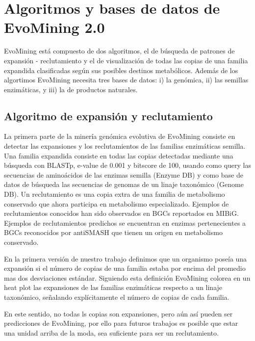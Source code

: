 \documentclass[12pt,twoside]{reedthesis}
\begin{document}
  \section{Algoritmos y bases de datos de EvoMining
  2.0}\label{algoritmos-y-bases-de-datos-de-evomining-2.0}
  
  EvoMining está compuesto de dos algoritmos, el de búsqueda de patrones
  de expansión - reclutamiento y el de visualización de todas las copias
  de una familia expandida clasificadas según sus posibles destinos
  metabólicos. Además de los algortimos EvoMining necesita tres bases de
  datos: i) la genómica, ii) las semillas enzimáticas, y iii) la de
  productos naturales.
  
  \subsection{Algoritmo de expansión y
  reclutamiento}\label{algoritmo-de-expansion-y-reclutamiento}
  
  La primera parte de la minería genómica evolutiva de EvoMining consiste
  en detectar las expansiones y los reclutamientos de las familias
  enzimáticas semilla. Una familia expandida consiste en todas las copias
  detectadas mediante una búsqueda con BLASTp, e-value de 0.001 y bitscore
  de 100, usando como query las secuencias de aminoácidos de las enzimas
  semilla (Enzyme DB) y como base de datos de búsqueda las secuencias de
  genomas de un linaje taxonómico (Genome DB). Un reclutamiento es una
  copia extra de una familia de metabolismo conservado que ahora participa
  en metabolismo especializado. Ejemplos de reclutamientos conocidos han
  sido observados en BGCs reportados en MIBiG. Ejemplos de reclutamientos
  predichos se encuentran en enzimas pertenecientes a BGCs reconocidos por
  antiSMASH que tienen un origen en metabolismo conservado.
  
  En la primera versión de nuestro trabajo definimos que un organismo
  poseía una expansión si el número de copias de una familia estaba por
  encima del promedio mas dos desviaciones estándar. Siguiendo esta
  definición EvoMining colorea en un heat plot las expansiones de las
  familias enzimáticas respecto a un linaje taxonómico, señalando
  explícitamente el número de copias de cada familia.
  
  En este sentido, no todas ls copias son expansiones, pero aún así pueden
  ser predicciones de EvoMining, por ello para futuros trabajos es posible
  que estar una unidad arriba de la moda, sea suficiente para ser un
  reclutamiento.
  
\end{document}
